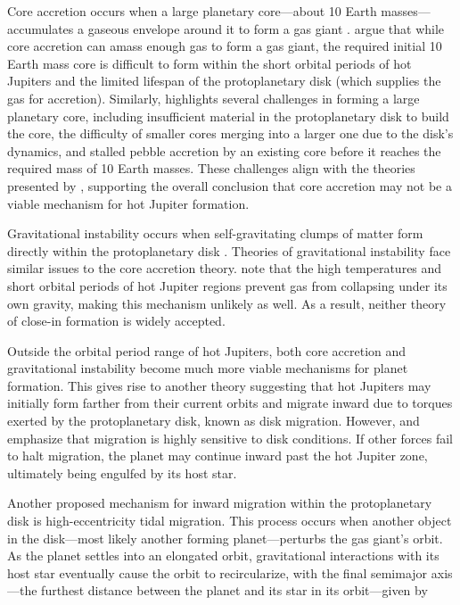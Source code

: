 \documentclass[oneside,12pt]{amsart}
\numberwithin{page}{section}
\begin{document}
Core accretion occurs when a large planetary core—about 10 Earth masses—accumulates a gaseous envelope around it to form a gas giant \citep{helled2013giant}. \citet{dawson2018origins} argue that while core accretion can amass enough gas to form a gas giant, the required initial 10 Earth mass core is difficult to form within the short orbital periods of hot Jupiters and the limited lifespan of the protoplanetary disk (which supplies the gas for accretion). Similarly, \citet{fortney2021hotjupiters} highlights several challenges in forming a large planetary core, including insufficient material in the protoplanetary disk to build the core, the difficulty of smaller cores merging into a larger one due to the disk's dynamics, and stalled pebble accretion by an existing core before it reaches the required mass of 10 Earth masses. These challenges align with the theories presented by \citet{dawson2018origins}, supporting the overall conclusion that core accretion may not be a viable mechanism for hot Jupiter formation.

Gravitational instability occurs when self-gravitating clumps of matter form directly within the protoplanetary disk \citep{helled2013giant}. Theories of gravitational instability face similar issues to the core accretion theory. \citet{dawson2018origins} note that the high temperatures and short orbital periods of hot Jupiter regions prevent gas from collapsing under its own gravity, making this mechanism unlikely as well. As a result, neither theory of close-in formation is widely accepted.

Outside the orbital period range of hot Jupiters, both core accretion and gravitational instability become much more viable mechanisms for planet formation. This gives rise to another theory suggesting that hot Jupiters may initially form farther from their current orbits and migrate inward due to torques exerted by the protoplanetary disk, known as disk migration. However, \citet{fortney2021hotjupiters} and \citet{dawson2018origins} emphasize that migration is highly sensitive to disk conditions. If other forces fail to halt migration, the planet may continue inward past the hot Jupiter zone, ultimately being engulfed by its host star.

Another proposed mechanism for inward migration within the protoplanetary disk is high-eccentricity tidal migration. This process occurs when another object in the disk—most likely another forming planet—perturbs the gas giant’s orbit. As the planet settles into an elongated orbit, gravitational interactions with its host star eventually cause the orbit to recircularize, with the final semimajor axis—the furthest distance between the planet and its star in its orbit—given by
\end{document}
